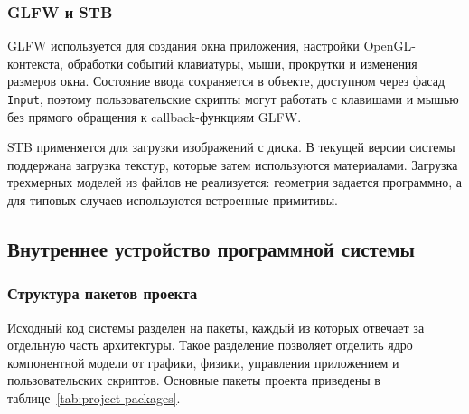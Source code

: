\subsubsection{GLFW и STB}

GLFW используется для создания окна приложения, настройки OpenGL-контекста,
обработки событий клавиатуры, мыши, прокрутки и изменения размеров окна.
Состояние ввода сохраняется в объекте, доступном через фасад \texttt{Input},
поэтому пользовательские скрипты могут работать с клавишами и мышью без
прямого обращения к callback-функциям GLFW.

STB применяется для загрузки изображений с диска. В текущей версии системы
поддержана загрузка текстур, которые затем используются материалами. Загрузка
трехмерных моделей из файлов не реализуется: геометрия задается программно,
а для типовых случаев используются встроенные примитивы.

\subsection{Внутреннее устройство программной системы}

\subsubsection{Структура пакетов проекта}

Исходный код системы разделен на пакеты, каждый из которых отвечает за
отдельную часть архитектуры. Такое разделение позволяет отделить ядро
компонентной модели от графики, физики, управления приложением и
пользовательских скриптов. Основные пакеты проекта приведены в
таблице~\ref{tab:project-packages}.

\begingroup
\small
\setlength{\tabcolsep}{4pt}
\renewcommand{\arraystretch}{1.2}

